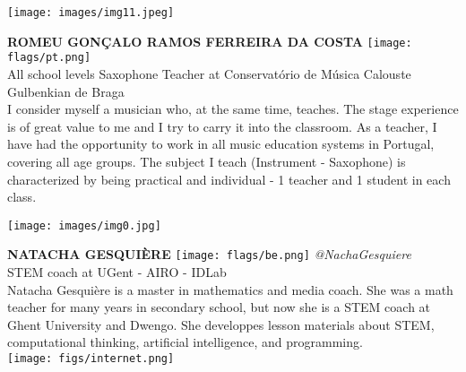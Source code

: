 \noindent
\begin{minipage}{0.3\textwidth}
\centering
\texttt{[image: images/img11.jpeg]}
\end{minipage}
\hfill
\begin{minipage}{0.6\textwidth}\raggedright
\color{color1}\uppercase{\textbf{Romeu Gonçalo Ramos Ferreira da Costa}}
\color{color2}\hspace{0.2cm}\texttt{[image: flags/pt.png]}
\\
All school levels Saxophone Teacher at Conservatório de Música Calouste Gulbenkian de Braga\\
{\footnotesize I consider myself a musician who, at the same time, teaches. The stage experience is of great value to me and I try to carry it into the classroom. As a teacher, I have had the opportunity to work in all music education systems in Portugal, covering all age groups. The subject I teach (Instrument - Saxophone) is characterized by being practical and individual - 1 teacher and 1 student in each class.}\\
\end{minipage}
\newline\newline\newline

\noindent
\begin{minipage}{0.3\textwidth}
\centering
\texttt{[image: images/img0.jpg]}
\end{minipage}
\hfill
\begin{minipage}{0.6\textwidth}\raggedright
\color{color1}\uppercase{\textbf{Natacha Gesquière}}
\color{color2}\hspace{0.2cm}\texttt{[image: flags/be.png]}
\hspace{0.2cm}\textit{@NachaGesquiere}
\\
STEM coach at UGent - AIRO - IDLab \\
{\footnotesize Natacha Gesquière is a master in mathematics and media coach. She was a math teacher for many years in secondary school, but now she is a STEM coach at Ghent University and Dwengo. She developpes lesson materials about STEM, computational thinking, artificial intelligence, and programming. }\\
\texttt{[image: figs/internet.png]}
\end{minipage}
\newline\newline\newline

